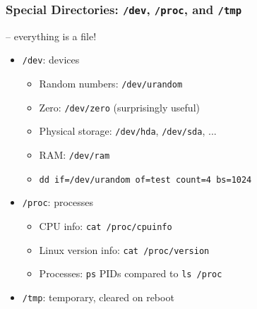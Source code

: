 \documentclass{beamer} \usetheme{Madrid}
\begin{document}
\begin{frame}
    \frametitle{Special Directories: \texttt{/dev}, \texttt{/proc}, and \texttt{/tmp}}
     -- everything is a file!
    \vspace{1cm}
    \begin{itemize}
        \item \texttt{/dev}: devices
            \begin{itemize}
                \item Random numbers: \texttt{/dev/urandom}
                \item Zero: \texttt{/dev/zero} (surprisingly useful)
                \item Physical storage: \texttt{/dev/hda}, \texttt{/dev/sda}, ...
                \item RAM: \texttt{/dev/ram}
                \item \texttt{dd if=/dev/urandom of=test count=4 bs=1024} \end{itemize}
        \item \texttt{/proc}: processes
            \begin{itemize}
                \item CPU info: \texttt{cat /proc/cpuinfo}
                \item Linux version info: \texttt{cat /proc/version}
                \item Processes: \texttt{ps} PIDs compared to \texttt{ls /proc}
            \end{itemize}
        \item \texttt{/tmp}: temporary, cleared on reboot
    \end{itemize}
\end{frame}
\end{document}
